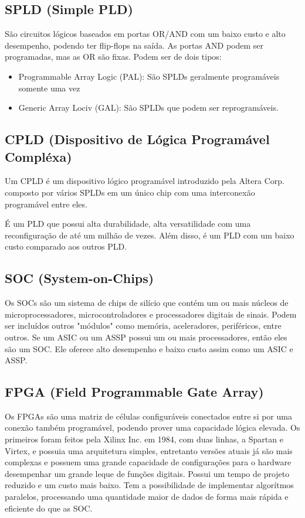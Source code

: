 \subsection{SPLD (Simple PLD)}
São circuitos lógicos baseados em portas OR/AND com um baixo custo e alto desempenho, podendo ter flip-flops na saída.
As portas AND podem ser programadas, mas as OR são fixas.
Podem ser de dois tipos:
\begin{itemize}
	\item Programmable Array Logic (PAL): São SPLDs geralmente programáveis somente uma vez
	\item Generic Array Lociv (GAL): São SPLDs que podem ser reprogramáveis.
\end{itemize}


\subsection{CPLD (Dispositivo de Lógica Programável Compléxa)}
Um CPLD é um dispositivo lógico programável introduzido pela Altera Corp. composto por vários SPLDs em um único chip com uma interconexão programável entre eles.
\par É um PLD que possui alta durabilidade, alta versatilidade com uma reconfiguração de até um milhão de vezes. 
Além disso, é um PLD com um baixo custo comparado aos outros PLD.

\subsection{SOC (System-on-Chips)}
Os SOCs são um sistema de chips de silício que contém um ou mais núcleos de microprocessadores, microcontroladores e processadores digitais de sinais.
Podem ser incluídos outros "módulos" como memória, aceleradores, periféricos, entre outros.
Se um ASIC ou um ASSP possui um ou mais processadores, então eles são um SOC.
Ele oferece alto desempenho e baixo custo assim como um ASIC e ASSP.

\subsection{FPGA (Field Programmable Gate Array)}
Os FPGAs são uma matriz de células configuráveis conectados entre si por uma conexão também programável, podendo prover uma capacidade lógica elevada.
Os primeiros foram feitos pela Xilinx Inc. em 1984, com duas linhas, a Spartan e Virtex, e possuia uma arquitetura simples, entretanto versões atuais já são mais complexas e possuem uma grande capacidade de configurações para o hardware desempenhar um grande leque de funções digitais.
Possui um tempo de projeto reduzido e um custo mais baixo.
Tem a possibilidade de implementar algorítmos paralelos, processando uma quantidade maior de dados de forma mais rápida e eficiente do que as SOC.


